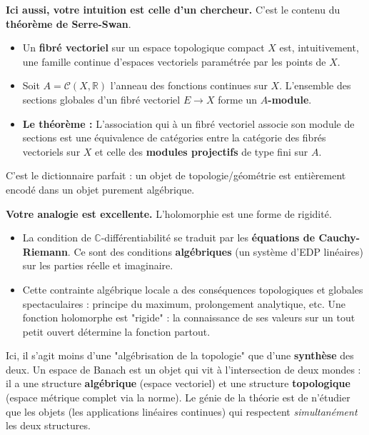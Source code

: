 \begin{proposition}
    \textbf{Ici aussi, votre intuition est celle d'un chercheur.} C'est le contenu du \textbf{théorème de Serre-Swan}.
    \begin{itemize}
        \item Un \textbf{fibré vectoriel} sur un espace topologique compact $X$ est, intuitivement, une famille continue d'espaces vectoriels paramétrée par les points de $X$.
        \item Soit $A = \mathcal{C}(X, \mathbb{R})$ l'anneau des fonctions continues sur $X$. L'ensemble des sections globales d'un fibré vectoriel $E \to X$ forme un \textbf{$A$-module}.
        \item \textbf{Le théorème :} L'association qui à un fibré vectoriel associe son module de sections est une équivalence de catégories entre la catégorie des fibrés vectoriels sur $X$ et celle des \textbf{modules projectifs} de type fini sur $A$.
    \end{itemize}
    C'est le dictionnaire parfait : un objet de topologie/géométrie est entièrement encodé dans un objet purement algébrique.
\end{proposition}

\begin{proposition}
    \textbf{Votre analogie est excellente.} L'holomorphie est une forme de rigidité.
    \begin{itemize}
        \item La condition de $\mathbb{C}$-différentiabilité se traduit par les \textbf{équations de Cauchy-Riemann}. Ce sont des conditions \textbf{algébriques} (un système d'EDP linéaires) sur les parties réelle et imaginaire.
        \item Cette contrainte algébrique locale a des conséquences topologiques et globales spectaculaires : principe du maximum, prolongement analytique, etc. Une fonction holomorphe est "rigide" : la connaissance de ses valeurs sur un tout petit ouvert détermine la fonction partout.
    \end{itemize}
\end{proposition}

\begin{proposition}
    Ici, il s'agit moins d'une "algébrisation de la topologie" que d'une \textbf{synthèse} des deux. Un espace de Banach est un objet qui vit à l'intersection de deux mondes : il a une structure \textbf{algébrique} (espace vectoriel) et une structure \textbf{topologique} (espace métrique complet via la norme). Le génie de la théorie est de n'étudier que les objets (les applications linéaires continues) qui respectent \textit{simultanément} les deux structures.
\end{proposition}

